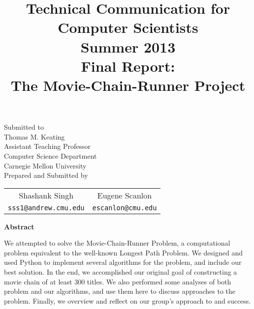 \documentclass[11pt,english]{article}
\title{
{\normalsize \bf Technical Communication for Computer Scientists\\
Summer 2013}\\
\vspace{2cm}
{\bf Final Report:\\The Movie-Chain-Runner Project}}
\author{
}
\begin{document}
\begin{titlepage}
\maketitle
\vfill
\begin{center}
Submitted to\\
Thomas M. Keating\\
Assistant Teaching Professor\\
Computer Science Department\\
Carnegie Mellon University\\
\vspace{1cm}
Prepared and Submitted by\\
\vspace{0.5cm}

\begin{tabular}{cc}
Shashank Singh \hspace{2cm} & Eugene Scanlon \\
\texttt{sss1@andrew.cmu.edu} \hspace{2cm} & \texttt{escanlon@cmu.edu}
\end{tabular}

\vspace{2cm}
{\bf Abstract}\\
\end{center}
We attempted to solve the Movie-Chain-Runner Problem, a computational problem
equivalent to the well-known Longest Path Problem. We designed and used Python
to implement several algorithms for the problem, and include our best solution.
In the end, we accomplished our original goal of constructing a movie chain of
at least 300 titles. We also performed some analyses of both problem and our
algorithms, and use them here to discuss approaches to the problem. Finally, we
overview and reflect on our group's approach to and success.

\end{titlepage}
\end{document}
